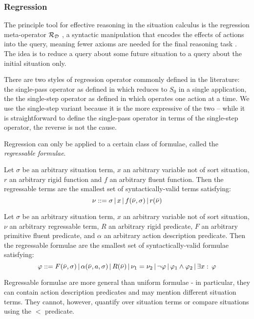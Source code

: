 \subsubsection{Regression}

The principle tool for effective reasoning in the situation calculus
is the regression meta-operator $\mathcal{R}_{\mathcal{D}}$ , a syntactic manipulation
that encodes the effects of actions into the query, meaning fewer
axioms are needed for the final reasoning task \citep{pirri99contributions_sitcalc}.
The idea is to reduce a query about some future situation to a query
about the initial situation only.

There are two styles of regression operator commonly defined in the
literature: the single-pass operator as defined in \citep{pirri99contributions_sitcalc}
which reduces to $S_{0}$ in a single application, the the single-step
operator as defined in \citep{scherl03sc_knowledge} which operates
one action at a time. We use the single-step variant because it is
the more expressive of the two -- while it is straightforward to define
the single-pass operator in terms of the single-step operator, the
reverse is not the cause.

Regression can only be applied to a certain class of formulae, called
the \emph{regressable formulae}.

\begin{defnL}
[{{[}{Regressable}] Terms}] Let $\sigma$ be an arbitrary
situation term, $x$ an arbitrary variable not of sort situation,
$r$ an arbitrary rigid function and $f$ an arbitrary fluent function.
Then the regressable terms are the smallest set of syntactically-valid
terms satisfying: \[
\nu::=\sigma\,|\, x\,|\, f(\bar{\nu},\sigma)\,|\, r(\bar{\nu})\]

\begin{defnL}
 Let $\sigma$ be an arbitrary situation
term, $x$ an arbitrary variable not of sort situation, $\nu$ an
arbitrary regressable term, $R$ an arbitrary rigid predicate, $F$
an arbitrary primitive fluent predicate, and $\alpha$ an arbitrary
action description predicate. Then the regressable formulae are the
smallest set of syntactically-valid formulae satisfying: \[
\varphi::=F(\bar{\nu},\sigma)\,|\,\alpha(\bar{\nu},a,\sigma)\,|\, R(\bar{\nu})\,|\,\nu_{1}=\nu_{2}\,|\,\neg\varphi\,|\,\varphi_{1}\wedge\varphi_{2}\,|\,\exists x:\,\varphi\]

\end{defnL}
\end{defnL}
Regressable formulae are more general than uniform formulae - in particular,
they can contain action description predicates and may mention different
situation terms. They cannot, however, quantify over situation terms
or compare situations using the $<$ predicate.

